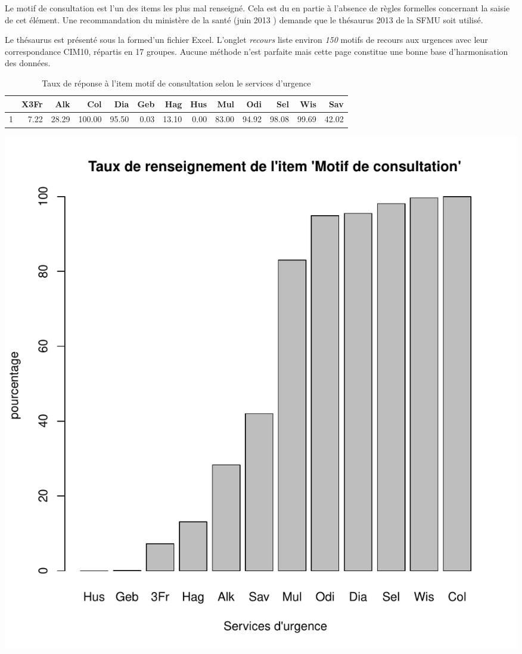 \documentclass[12pt,english,french,twoside]{report}\usepackage[]{graphicx}\usepackage[]{color}
\makeatletter
\def\maxwidth{ %
  \ifdim\Gin@nat@width>\linewidth
    \linewidth
  \else
    \Gin@nat@width
  \fi
}
\makeatother
\begin{document}
Le motif de consultation est l'un des items les plus mal renseigné. Cela est du en partie à l'absence de règles formelles concernant la saisie de cet élément. Une recommandation du ministère de la santé (juin 2013 \cite{12,13}) demande que le thésaurus 2013 de la SFMU \cite{9} soit utilisé.

Le thésaurus est présenté sous la formed'un fichier Excel. L'onglet \emph{recours} liste environ \emph{150} motifs de recours aux urgences avec leur correspondance CIM10, répartis en 17 groupes. Aucune méthode n'est parfaite mais cette page constitue une bonne base d'harmonisation des données.


\begin{table}[ht]
\centering
\begin{tabular}{rrrrrrrrrrrrr}
  \hline
 & X3Fr & Alk & Col & Dia & Geb & Hag & Hus & Mul & Odi & Sel & Wis & Sav \\ 
  \hline
1 & 7.22 & 28.29 & 100.00 & 95.50 & 0.03 & 13.10 & 0.00 & 83.00 & 94.92 & 98.08 & 99.69 & 42.02 \\ 
   \hline
\end{tabular}
\caption[motif de consultation]{Taux de réponse à l'item motif de consultation selon le services d'urgence} 
\label{lab:motif}
\end{table}

\includegraphics[width=\maxwidth]{figure/motifss1} 
\end{document}
